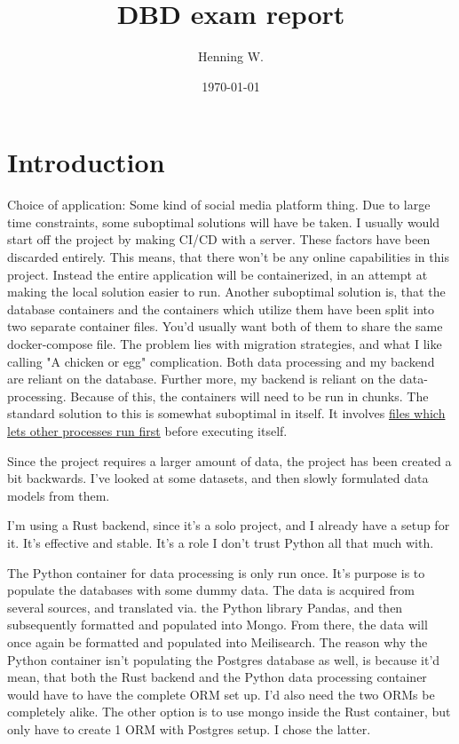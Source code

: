 \documentclass[a4paper, 12pt]{article}
\begin{document}
\title{\Large{\textbf{DBD exam report}}}
\author{Henning W.}
\date{\today}
\maketitle
\fancyhf{}
\renewcommand{\headrulewidth}{2pt}
\renewcommand{\headrulewidth}{2pt}
\fancyhead{\leftmark}
\fancyfoot{\thepage}

\section{Introduction}
Choice of application: Some kind of social media platform thing. Due to large time constraints, some suboptimal solutions will have be taken. I usually would start off the project by making CI/CD with a server. These factors have been discarded entirely. This means, that there won't be any online capabilities in this project. Instead the entire application will be containerized, in an attempt at making the local solution easier to run. Another suboptimal solution is, that the database containers and the containers which utilize them have been split into two separate container files. You'd usually want both of them to share the same docker-compose file. The problem lies with migration strategies, and what I like calling "A chicken or egg" complication. Both data processing and my backend are reliant on the database. Further more, my backend is reliant on the data-processing. Because of this, the containers will need to be run in chunks. The standard solution to this is somewhat suboptimal in itself. It involves \href{https://github.com/vishnubob/wait-for-it}{files which lets other processes run first} before executing itself.

Since the project requires a larger amount of data, the project has been created a bit backwards. I've looked at some datasets, and then slowly formulated data models from them.

I'm using a Rust backend, since it's a solo project, and I already have a setup for it. It's effective and stable. It's a role I don't trust Python all that much with.

The Python container for data processing is only run once. It's purpose is to populate the databases with some dummy data. The data is acquired from several sources, and translated via. the Python library Pandas, and then subsequently formatted and populated into Mongo. From there, the data will once again be formatted and populated into Meilisearch.
The reason why the Python container isn't populating the Postgres database as well, is because it'd mean, that both the Rust backend and the Python data processing container would have to have the complete ORM set up.
I'd also need the two ORMs be completely alike.
The other option is to use mongo inside the Rust container, but only have to create 1 ORM with Postgres setup. I chose the latter.
\end{document}
